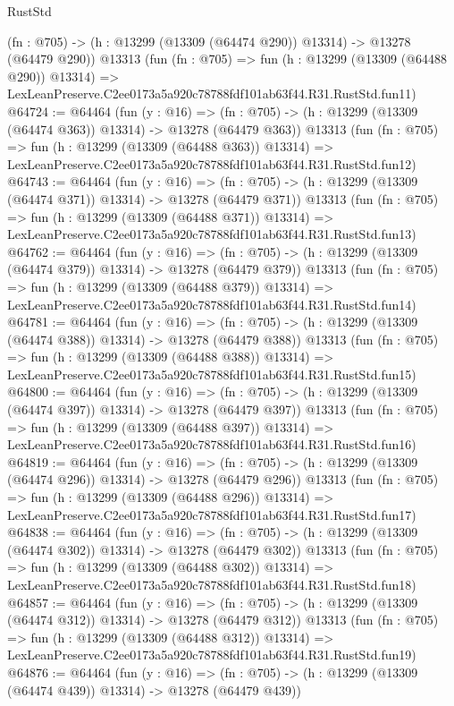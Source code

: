 \begin{lexlean}{RustStd}
\begin{coremodule}
    (fn : @705) -> (h : @13299 (@13309 (@64474 @290)) @13314) -> @13278 (@64479 @290))
    @13313
    (fun (fn : @705) =>
    fun (h : @13299 (@13309 (@64488 @290)) @13314) =>
    LexLeanPreserve.C2ee0173a5a920c78788fdf101ab63f44.R31.RustStd.fun11)
@64724 := @64464
    (fun (y : @16) =>
    (fn : @705) -> (h : @13299 (@13309 (@64474 @363)) @13314) -> @13278 (@64479 @363))
    @13313
    (fun (fn : @705) =>
    fun (h : @13299 (@13309 (@64488 @363)) @13314) =>
    LexLeanPreserve.C2ee0173a5a920c78788fdf101ab63f44.R31.RustStd.fun12)
@64743 := @64464
    (fun (y : @16) =>
    (fn : @705) -> (h : @13299 (@13309 (@64474 @371)) @13314) -> @13278 (@64479 @371))
    @13313
    (fun (fn : @705) =>
    fun (h : @13299 (@13309 (@64488 @371)) @13314) =>
    LexLeanPreserve.C2ee0173a5a920c78788fdf101ab63f44.R31.RustStd.fun13)
@64762 := @64464
    (fun (y : @16) =>
    (fn : @705) -> (h : @13299 (@13309 (@64474 @379)) @13314) -> @13278 (@64479 @379))
    @13313
    (fun (fn : @705) =>
    fun (h : @13299 (@13309 (@64488 @379)) @13314) =>
    LexLeanPreserve.C2ee0173a5a920c78788fdf101ab63f44.R31.RustStd.fun14)
@64781 := @64464
    (fun (y : @16) =>
    (fn : @705) -> (h : @13299 (@13309 (@64474 @388)) @13314) -> @13278 (@64479 @388))
    @13313
    (fun (fn : @705) =>
    fun (h : @13299 (@13309 (@64488 @388)) @13314) =>
    LexLeanPreserve.C2ee0173a5a920c78788fdf101ab63f44.R31.RustStd.fun15)
@64800 := @64464
    (fun (y : @16) =>
    (fn : @705) -> (h : @13299 (@13309 (@64474 @397)) @13314) -> @13278 (@64479 @397))
    @13313
    (fun (fn : @705) =>
    fun (h : @13299 (@13309 (@64488 @397)) @13314) =>
    LexLeanPreserve.C2ee0173a5a920c78788fdf101ab63f44.R31.RustStd.fun16)
@64819 := @64464
    (fun (y : @16) =>
    (fn : @705) -> (h : @13299 (@13309 (@64474 @296)) @13314) -> @13278 (@64479 @296))
    @13313
    (fun (fn : @705) =>
    fun (h : @13299 (@13309 (@64488 @296)) @13314) =>
    LexLeanPreserve.C2ee0173a5a920c78788fdf101ab63f44.R31.RustStd.fun17)
@64838 := @64464
    (fun (y : @16) =>
    (fn : @705) -> (h : @13299 (@13309 (@64474 @302)) @13314) -> @13278 (@64479 @302))
    @13313
    (fun (fn : @705) =>
    fun (h : @13299 (@13309 (@64488 @302)) @13314) =>
    LexLeanPreserve.C2ee0173a5a920c78788fdf101ab63f44.R31.RustStd.fun18)
@64857 := @64464
    (fun (y : @16) =>
    (fn : @705) -> (h : @13299 (@13309 (@64474 @312)) @13314) -> @13278 (@64479 @312))
    @13313
    (fun (fn : @705) =>
    fun (h : @13299 (@13309 (@64488 @312)) @13314) =>
    LexLeanPreserve.C2ee0173a5a920c78788fdf101ab63f44.R31.RustStd.fun19)
@64876 := @64464
    (fun (y : @16) =>
    (fn : @705) -> (h : @13299 (@13309 (@64474 @439)) @13314) -> @13278 (@64479 @439))

\end{coremodule}
\end{lexlean}
